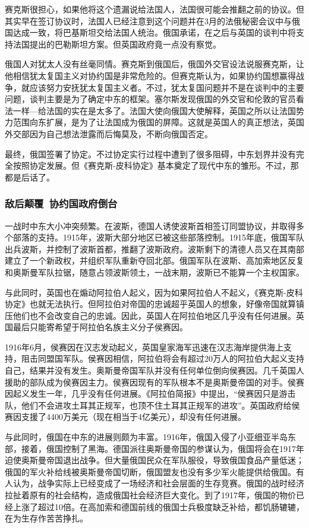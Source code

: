 \documentclass{article}
\begin{document}
赛克斯很担心，如果他将这个遗漏说给法国人，法国很可能会推翻之前的协议。但其实早在签订协议时，法国人已经注意到这个问题并在3月的法俄秘密会议中与俄国达成一致，将巴基斯坦交给法国人统治。俄国承诺，在之后与英国的谈判中将支持法国提出的巴勒斯坦方案。但英国政府竟一点没有察觉。

俄国人对犹太人没有丝毫同情。赛克斯到俄国后，俄国外交官设法说服赛克斯，让他相信犹太复国主义对协约国是非常危险的。但赛克斯认为，如果协约国想赢得战争，就应该努力安抚犹太复国主义者。不过，犹太复国问题并不是在谈判中的主要问题，谈判主要是为了确定中东的框架。塞尔斯发现俄国的外交官和伦敦的官员看法一样---给法国的实在是太多了。法国大使向俄国大使解释，英国之所以让法国势力范围向东扩展，是为了让法国成为俄国的屏障。这就是英国人的真正想法，英国外交部因为自己想法泄露而后悔莫及，不断向俄国否定。

最终，俄国签署了协定。不过协定实行过程中遭到了很多阻碍，中东划界并没有完全按照协定发展。但《赛克斯-皮科协定》基本奠定了现代中东的雏形。不过，那都是后话了。

\subsubsection{敌后颠覆\ 协约国政府倒台}
一战时中东大小冲突频繁。在波斯，德国人诱使波斯首相签订同盟协议，并取得多个部落的支持。1915年，波斯大部分地区已被这些部落控制。1915年底，俄国军队出兵波斯，并控制了波斯首都，推翻了波斯政府。波斯剩下的清德人员又在其南部建立了一个新政权，并组织军队重新夺回北部。俄国军队在波斯、高加索地区反复和奥斯曼军队拉锯，随意占领波斯领土，一战末期，波斯已不能算一个主权国家。

与此同时，英国也在煽动阿拉伯人起义，因为如果阿拉伯人不起义，《赛克斯-皮科协定》也就无法执行。但阿拉伯对帝国的忠诚超乎英国人的想象，好像帝国就算镇压他们也不会改变自己的忠诚。因此，英国人在阿拉伯地区几乎没有任何进展。英国最后只能寄希望于阿拉伯名族主义分子侯赛因。

1916年6月，侯赛因在汉志发动起义，英国皇家海军迅速在汉志海岸提供海上支持，阻击同盟国军队。侯赛因相信，阿拉伯将会有超过20万人的阿拉伯大起义支持自己，结果并没有发生。奥斯曼帝国军队并没有任何单位倒向侯赛因。几千英国人援助的部队成为侯赛因主力。侯赛因现有的军队根本不是奥斯曼帝国的对手。侯赛因起义发生一年，几乎没有任何进展。《阿拉伯简报》中提出，“侯赛因只是游击队，他们不会进攻土耳其正规军，也顶不住土耳其正规军的进攻”。英国政府给侯赛因支援了4400万美元（现在相当于4亿美元），却没有任何进展。

与此同时，俄国在中东的进展则颇为丰富。1916年，俄国入侵了小亚细亚半岛东部，接着，俄国控制了黑海。德国派往奥斯曼帝国的参谋认为，俄国将会在1917年迫使奥斯曼帝国退出战争。但大量俄国民众在军队服役，导致俄国食品产量低迷；俄国的军火补给线被奥斯曼帝国切断，俄国盟友也没有多少军火能提供给俄国。有人认为，战争实际上已经变成了一场经济和社会层面的生存竞赛。俄国的战时经济拉扯着原有的社会结构，造成俄国社会经济巨大变化。到了1917年，俄国的物价已经上涨了超过10倍。在高加索和德国前线的俄国士兵极度缺乏补给，都饥肠辘辘，在为生存作苦苦挣扎。
\end{document}
